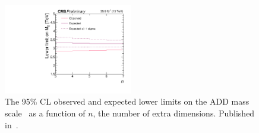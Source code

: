 \begin{figure}[htbp]
  \begin{center}
    \includegraphics[width=0.5\textwidth]{figures/exo16053/Figure_011.pdf}
    \caption{The 95\% CL observed and expected lower limits on the ADD mass scale \mD\ as a function of $n$, the number of extra dimensions.
    Published in~\cite{ref:JHEP02(2019)074}.}
    \label{fig:MDLimits}
  \end{center}
\end{figure}

